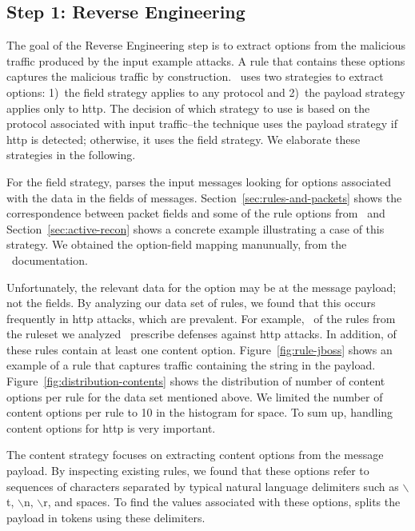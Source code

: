 \documentclass[sigconf,review, anonymous]{acmart}
\begin{document}
\subsection{Step 1: Reverse Engineering}
\label{sec:reverse-engineering}

The goal of the Reverse Engineering step is to extract options from
the malicious traffic produced by the input example attacks. A rule
that contains these options captures the malicious traffic by
construction. \tname\ uses two strategies to extract options: 1)~the
field strategy applies to any protocol and 2)~the payload strategy
applies only to http.  The decision of which strategy to use is based
on the protocol associated with input traffic--the technique uses the
payload strategy if http is detected; otherwise, it uses the field
strategy. We elaborate these strategies in the following.

For the field strategy, \tname{} parses the input messages looking for
options associated with the data in the fields of
messages. Section~\ref{sec:rules-and-packets} shows the correspondence
between packet fields and some of the rule options from \suri\ and
Section~\ref{sec:active-recon} shows a concrete example illustrating a
case of this strategy. We obtained the option-field mapping
manunually, from the \suri\ documentation.

Unfortunately, the relevant data for the option may be at the message
payload; not the fields. By analyzing our data set of rules, we found
that this occurs frequently in http attacks, which are prevalent. For
example, \percHttp\ of the \numrulessuri{} rules from the ruleset we
analyzed~\cite{emerging-threats-open} prescribe defenses against http
attacks. In addition, \percRulesWithContent{} of these rules contain
at least one content option. Figure~\ref{fig:rule-jboss} shows an
example of a rule that captures traffic containing the string
 in the payload.
Figure~\ref{fig:distribution-contents} shows the distribution of
number of content options per rule for the data set mentioned
above. We limited the number of content options per rule to 10 in the
histogram for space.   To sum up, handling content options for
http is very important.

The content strategy focuses on extracting content options from the
message payload. By inspecting existing rules, we found that these
options refer to sequences of characters separated by typical natural
language delimiters such as $\backslash$t, $\backslash$n,
$\backslash$r, and spaces. To find the values associated with these
options, \tname{} splits the payload in tokens using these delimiters.
\end{document}

